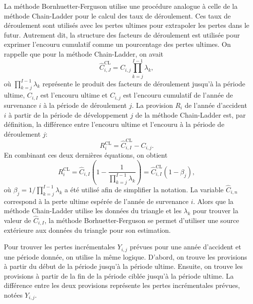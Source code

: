 La méthode Bornhuetter-Ferguson utilise une procédure analogue à celle
de la méthode Chain-Ladder pour le calcul des taux de déroulement. Ces
taux de déroulement sont utilisés avec les pertes ultimes pour
extrapoler les pertes dans le futur. Autrement dit, la structure des
facteurs de déroulement est utilisée pour exprimer l'encouru cumulatif
comme un pourcentage des pertes ultimes. On rappelle que pour la
méthode Chain-Ladder, on avait
\begin{equation*}
  \hat{C}_{i, J}^{\text{CL}} = C_{i, j} \prod_{k = j}^{I-1} \lambda_k,
\end{equation*}
où $\prod_{k=j}^{I-1} \lambda_k $ représente le produit des facteurs
de déroulement jusqu'à la période ultime, $C_{i, I}$ est l'encouru
ultime et $C_{i, j}$ est l'encouru cumulatif de l'année de survenance
$i$ à la période de déroulement $j$. La provision $R_i$ de l'année
d'accident $i$ à partir de la période de développement $j$ de la
méthode Chain-Ladder est, par définition, la différence entre
l'encouru ultime et l'encouru à la période de déroulement $j$:
\begin{equation*}
  R_i^{\text{CL}} = \hat{C}_{i, I}^{\text{CL}} - C_{i, j}.
\end{equation*}
En combinant ces deux dernières équations, on obtient
\begin{equation*}
  R_i^{\text{CL}} = \hat{C}_{i, I}
  \left(
    1 - \frac{1}{\prod_{k=j}^{I-1} \lambda_k}
  \right) =  \hat{C}_{i, I}^{\text{CL}} (1 - \beta_j),
\end{equation*}
où $\beta_j = 1/\prod_{k=j}^{I-1} \lambda_k$ a été utilisé afin
de simplifier la notation. La variable $\hat{C}_{i,n}$ correspond à la
perte ultime espérée de l'année de survenance $i$. Alors que la
méthode Chain-Ladder utilise les données du triangle et les
$\lambda_k$ pour trouver la valeur de $\hat{C}_{i,I}$, la méthode
Borhuetter-Ferguson se permet d'utiliser une source extérieure aux
données du triangle pour son estimation.

Pour trouver les pertes incrémentales $Y_{i,j}$ prévues pour une année
d'accident et une période donnée, on utilise la même logique. D'abord,
on trouve les provisions à partir du début de la période jusqu'à la
période ultime. Ensuite, on trouve les provisions à partir de la fin de
la période ciblée jusqu'à la période ultime. La différence entre les
deux provisions représente les pertes incrémentales prévues, notées
$Y_{i,j}$.


